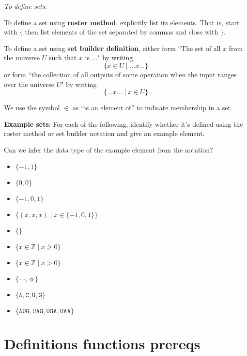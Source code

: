 \documentclass[12pt, oneside]{article}
\newcommand{\A}[0]{\texttt{A}}
\newcommand{\C}[0]{\texttt{C}}
\newcommand{\G}[0]{\texttt{G}}
\newcommand{\U}[0]{\texttt{U}}
\begin{document}
{\it To define sets:}

To define a set using {\bf roster method}, explicitly list its elements. That is,
start with $\{$ then list elements of 
the set separated by commas and close with $\}$.

\vfill

To define a set using {\bf set builder definition}, either form 
``The set of all $x$ from the universe $U$ such that $x$ is ..." by writing
\[\{x \in U \mid ...x... \}\]
or form ``the collection of all outputs of some operation when the input ranges over the universe $U$"
by writing
\[\{ ...x... \mid x\in U \}\]

\vfill

We use the symbol $\in$ as ``is an element of'' to indicate membership in a set.\\

\newpage 

{\bf Example sets}: For each of the following, identify whether it's defined using the roster method
or set builder notation and give an example element.

Can we infer the data type of the example element from the notation?

\begin{itemize}
    \item[]$\{ -1, 1\}$
    \vfill
    \item[]$\{0, 0 \}$
    \vfill
    \item[]$\{-1, 0, 1 \}$
    \vfill
    \item[]$\{(x,x,x) \mid x \in \{-1,0,1\} \}$
    \vfill
    \item[]$\{ \}$
    \vfill
    \item[]$\{ x \in \mathbb{Z} \mid x \geq 0 \}$
    \vfill
    \item[]$\{ x \in \mathbb{Z}  \mid x > 0 \}$
    \vfill
    \item[]$\{ \smile, \sun \}$
    \vfill
    \item[]$\{\A,\C,\U,\G\}$
    \vfill
    \item[]$\{\A\U\G, \U\A\G, \U\G\A, \U\A\A \}$
    \vfill
\end{itemize}
 \vfill
\section*{Definitions functions prereqs}
\end{document}
